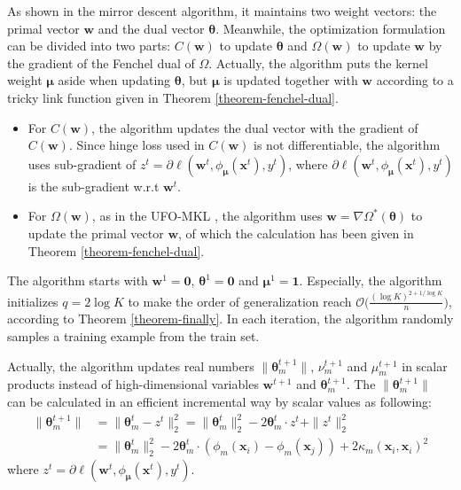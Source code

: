 \documentclass{article}
\begin{document}
 As shown in the mirror descent algorithm, it maintains two weight vectors: the primal vector $\mathbf w$ and the dual vector $\pmb{\theta}$.
 Meanwhile, the optimization formulation can be divided into two parts: $C(\mathbf w)$
 to update $\pmb{\theta}$  and $\Omega(\mathbf w)$ to update $\mathbf w$ by
 the gradient of the Fenchel dual of $\Omega$.
 Actually, the algorithm puts the kernel weight $\pmb{\mu}$ aside when updating $\pmb{\theta}$,
 but $\pmb{\mu}$ is updated together with $\mathbf w$ according to a tricky link function given in Theorem \ref{theorem-fenchel-dual}.

\begin{itemize}
\item For $C(\mathbf w)$, the algorithm updates the dual vector with the gradient of $C(\mathbf w)$.
Since hinge loss used in $C(\mathbf w)$ is not differentiable,
the algorithm uses sub-gradient of $z^t=\partial\ell(\mathbf w^t,\phi_{\bm \mu}(\mathbf{x}^t), y^t)$,
where $\partial\ell(\mathbf w^t,\phi_{\bm \mu}(\mathbf{x}^t), y^t)$ is the sub-gradient w.r.t $\mathbf w^t$.

\item For $\Omega(\mathbf w)$, as in the UFO-MKL \cite{OrabonaL11},
the algorithm uses $\mathbf w=\nabla\Omega^\ast(\pmb{\theta})$ to update the primal vector $\mathbf w$,
of which the calculation has been given in Theorem \ref{theorem-fenchel-dual}.
\end{itemize}

The algorithm starts with $\mathbf{w}^1=\mathbf{0}$, $\pmb{\theta}^1=\mathbf{0}$ and $\pmb{\mu}^1=\mathbf{1}$.
Especially, the algorithm initializes $q=2\log K$ to make the order of generalization reach
$\mathcal{O}\big(\frac{(\log K)^{2+1/\log K}}{n}\big)$, according to Theorem \ref{theorem-finally}.
In each iteration, the algorithm randomly samples a training example from the train set.

Actually, the algorithm updates real numbers $\|\bm \theta_m^{t+1}\|$, $\nu_m^{t+1}$ and $\mu_m^{t+1}$ in scalar products instead of high-dimensional variables $\mathbf w^{t+1}$ and $\bm \theta_m^{t+1}$.
The $\|\bm \theta_m^{t+1}\|$ can be calculated in an efficient incremental way by scalar values as following:
\begin{align*}
\|\pmb{\theta}_m^{t+1}\|
&=\|\pmb{\theta}_m^{t}-z^t\|_2^2
=\|\pmb{\theta}_m^{t}\|_2^2-2\pmb{\theta}_m^t \cdot z^t +\|z^t\|_2^2\\
&=\|\pmb{\theta}_m^{t}\|_2^2-2\pmb{\theta}_m^t \cdot (\phi_m(\mathbf{x}_i)-\phi_m(\mathbf{x}_j))
+ 2\kappa_m(\mathbf{x}_i, \mathbf{x}_i)^2
\end{align*}
where $z^t=\partial\ell(\mathbf w^t,\phi_{\bm \mu}(\mathbf{x}^t), y^t)$.
\end{document}

